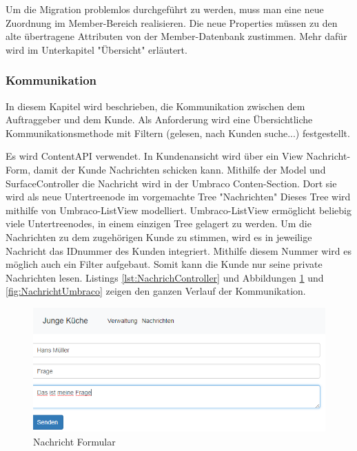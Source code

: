 Um die Migration problemlos durchgeführt zu werden, muss man eine neue Zuordnung im Member-Bereich realisieren. Die neue Properties müssen zu den alte übertragene Attributen von der Member-Datenbank zustimmen. Mehr dafür wird im Unterkapitel "Übersicht" erläutert.  
\subsubsection{Kommunikation}

In diesem Kapitel wird beschrieben, die Kommunikation zwischen dem Auftraggeber und dem Kunde. Als Anforderung wird eine Übersichtliche Kommunikationsmethode mit Filtern (gelesen, nach Kunden suche...) festgestellt.

Es wird ContentAPI \cite{UmbracoHQContent2018} verwendet. In Kundenansicht wird über ein View Nachricht-Form, damit der Kunde Nachrichten schicken kann. Mithilfe der Model und SurfaceController die Nachricht wird in der Umbraco Conten-Section. Dort sie wird als neue Untertreenode im vorgemachte Tree "Nachrichten" Dieses Tree wird mithilfe von Umbraco-ListView modelliert. Umbraco-ListView ermöglicht beliebig viele Untertreenodes, in einem einzigen Tree gelagert zu werden. Um die Nachrichten zu dem zugehörigen Kunde zu stimmen, wird es in jeweilige Nachricht das IDnummer des Kunden integriert. Mithilfe diesem Nummer wird es möglich auch ein Filter aufgebaut. Somit kann die Kunde nur seine private Nachrichten lesen. Listings \ref{lst:NachrichController} und Abbildungen \ref{fig:NachrichtNEU} und \ref{fig:NachrichtUmbraco} zeigen den ganzen Verlauf der Kommunikation.

\begin{figure}[h]
	\centering
	\includegraphics[width=0.7\linewidth]{Graphics/NachrichtNEU.png}
	\caption[Nachricht Formular]{Nachricht Formular}
	\label{fig:NachrichtNEU}
\end{figure}

\pagebreak

